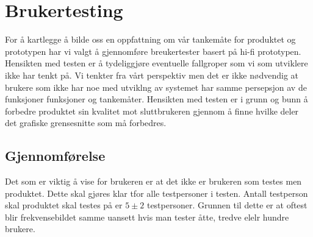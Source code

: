 \chapter{Brukertesting}
\lettrine[lines=2]{F}{}or å kartlegge å bilde oss en oppfattning om vår tankemåte for produktet og prototypen har vi valgt å gjennomføre breukertester basert på hi-fi prototypen. Hensikten med testen er å tydeliggjøre eventuelle fallgroper som vi som utviklere ikke har tenkt på. Vi tenkter fra vårt perspektiv men det er ikke nødvendig at brukere som ikke har noe med utviklng av systemet har samme persepsjon av de funksjoner funksjoner og tankemåter. 
Hensikten med testen er i grunn og bunn å forbedre produktet sin kvalitet mot sluttbrukeren gjennom å finne hvilke deler det grafiske grensesnitte som må forbedres. 

\section{Gjennomførelse}
Det som er viktig å vise for brukeren er at det ikke er brukeren som testes men produktet. Dette skal gjøres klar tfor alle testpersoner i testen. Antall testperson skal produktet skal testes på er $5 \pm 2$ testpersoner. Grunnen til dette er at oftest blir frekvensebildet samme uansett hvis man tester åtte, tredve elelr hundre brukere.\cite{lazar2010research}\cite{book:utforming}

